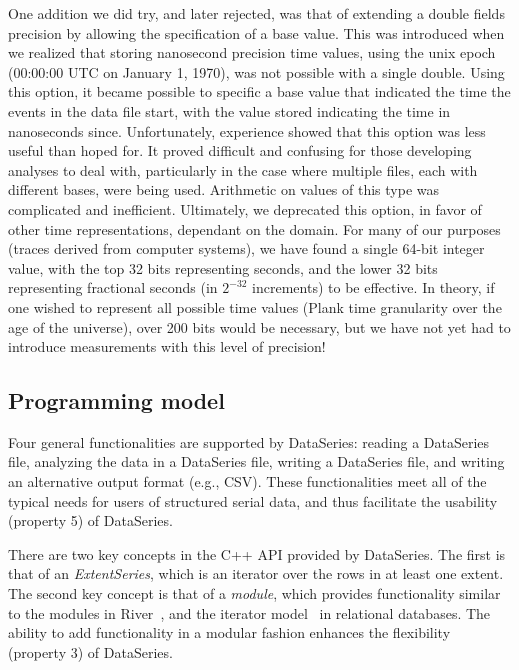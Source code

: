 \documentclass{acm_proc_article-sp}
\begin{document}
One addition we did try, and later rejected, was that of extending a
double fields precision by allowing the specification of a base value.
This was introduced when we realized that storing nanosecond precision
time values, using the unix epoch (00:00:00 UTC on January 1, 1970),
was not possible with a single double. Using this option, it became
possible to specific a base value that indicated the time the events
in the data file start, with the value stored indicating the time in
nanoseconds since. Unfortunately, experience showed that this option
was less useful than hoped for. It proved difficult and confusing for
those developing analyses to deal with, particularly in the case where
multiple files, each with different bases, were being used. Arithmetic
on values of this type was complicated and inefficient. Ultimately, we
deprecated this option, in favor of other time representations,
dependant on the domain. For many of our purposes (traces derived from
computer systems), we have found a single 64-bit integer value, with
the top 32 bits representing seconds, and the lower 32 bits
representing fractional seconds (in $2^{-32}$ increments) to be
effective. In theory, if one wished to represent all possible time
values (Plank time granularity over the age of the universe), over 200
bits would be necessary, but we have not yet had to introduce
measurements with this level of precision!


\subsection{Programming model}
Four general functionalities are supported by DataSeries:
reading a DataSeries file, 
analyzing the data in a DataSeries file,
writing a DataSeries file,
and writing an alternative output format (e.g., CSV).
These functionalities meet all of the typical needs for
users of structured serial data, and thus facilitate
the usability (property 5) of DataSeries.

There are two key concepts in the C++ API provided by DataSeries. The
first is that of an \textit{ExtentSeries}, which is an iterator over
the rows in at least one extent.  
The second key concept is that of a \textit{module}, which provides
functionality similar to the modules in River~\cite{river99}, and the
iterator model~\cite{graefeQueryProcessing93} in relational databases.
The ability to add functionality in a modular fashion enhances
the flexibility (property 3) of DataSeries.
\end{document}
